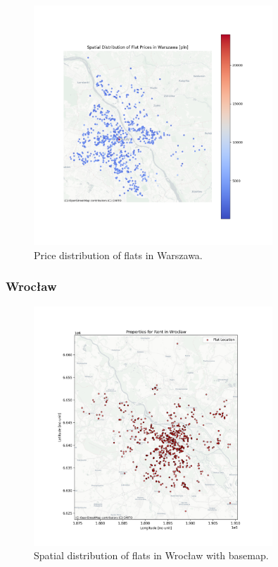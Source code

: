     \begin{figure}[H]
        \centering
        \includegraphics[width=0.8\textwidth]{figures/warsaw_price_distribution.png}
        \caption{Price distribution of flats in Warszawa.}
        \label{fig:warsaw_price_distribution}
    \end{figure}

    \subsubsection{Wrocław}
    \begin{figure}[H]
        \centering
        \includegraphics[width=0.8\textwidth]{figures/wroclaw_flats_map_with_basemap.png}
        \caption{Spatial distribution of flats in Wrocław with basemap.}
        \label{fig:wroclaw_basemap}
    \end{figure}


